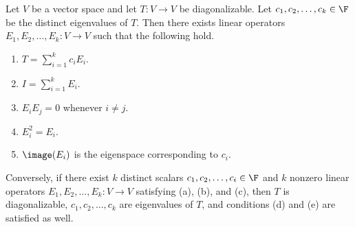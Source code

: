 \documentclass[linearalgebra]{subfiles}
\begin{document}
    \clearpage
    \begin{theorem}{}
        Let $V$ be a vector space and let $T:V\to V$ be diagonalizable. Let $c_1,c_2,\ldots,c_k\in\F$ be the distinct eigenvalues of $T$. Then there exists linear operators $E_1,E_2,\ldots,E_k:V\to V$ such that the following hold.
        \begin{enumerate}
            \item $T = \sum^{k}_{i=1} c_iE_i$.
            \item $I = \sum^{k}_{i=1} E_i$.
            \item $E_iE_j = 0$ whenever $i\neq j$.
            \item $E_i^2 = E_i$.
            \item $\image(E_i)$ is the eigenspace corresponding to $c_i$.
        \end{enumerate}
        Conversely, if there exist $k$ distinct scalars $c_1, c_2, \ldots, c_i\in \F$ and $k$ nonzero linear operators $E_1, E_2, \ldots, E_k: V\to V$ satisfying (a), (b), and (c), then $T$ is diagonalizable, $c_1, c_2, \ldots, c_k$ are eigenvalues of $T$, and conditions (d) and (e) are satisfied as well.
    \end{theorem}
\end{document}
